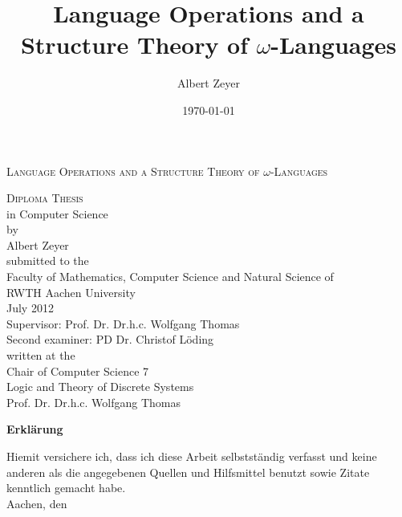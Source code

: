 \documentclass[twoside,openright]{article}
\begin{document}
\title{Language Operations and a Structure Theory of $\omega$-Languages}
\author{Albert Zeyer}
\date{\today}

\begin{titlepage}
\begin{center}
\setlength{\parskip}{2ex plus0.5ex minus0.2ex}
\setlength{\baselineskip}{5ex}
\textsc{\LARGE Language Operations and a Structure Theory of $\omega$-Languages}\\[1.5cm]

\setlength{\baselineskip}{3ex}

\textsc{Diploma Thesis} \\
in Computer Science \\[0.7cm]

by \\
Albert Zeyer \\[3cm]

submitted to the \\
Faculty of Mathematics, Computer Science and Natural Science of \\
RWTH Aachen University \\[1.5cm]

July 2012 \\[1.5cm]

Supervisor: Prof. Dr. Dr.h.c. Wolfgang Thomas \\
Second examiner: PD Dr. Christof Löding \\[1.5cm]

written at the \\
Chair of Computer Science 7 \\
Logic and Theory of Discrete Systems \\
Prof. Dr. Dr.h.c. Wolfgang Thomas

\end{center}
\end{titlepage}

\titlepage
\newpage
\newpage

\begin{titlepage}
\setlength{\parindent}{0pt}
\setlength{\parskip}{3ex}
\textbf{\large Erklärung}

Hiemit versichere ich, dass ich diese Arbeit selbstständig verfasst und keine anderen als die angegebenen Quellen und Hilfsmittel benutzt sowie Zitate kenntlich gemacht habe.\\

Aachen, den \todaygerman
\end{titlepage}
\end{document}
